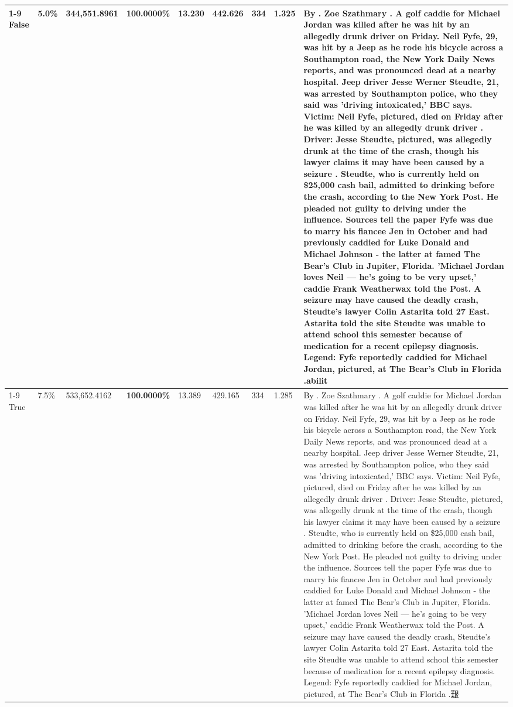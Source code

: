 \begin{table}[H]
\begin{tabular}{lllrlllll}
\cline{1-9}
False & 5.0\% & 344,551.8961 & \bfseries \color{red} 100.0000\% & 13.230 & 442.626 & 334 & 1.325 & By . Zoe Szathmary . A golf caddie for Michael Jordan was killed after he was hit by an allegedly drunk driver on Friday. Neil Fyfe, 29, was hit by a Jeep as he rode his bicycle across a Southampton road, the New York Daily News reports, and was pronounced dead at a nearby hospital. Jeep driver Jesse Werner Steudte, 21, was arrested by Southampton police, who they said was 'driving intoxicated,' BBC says. Victim: Neil Fyfe, pictured, died on Friday after he was killed by an allegedly drunk driver . Driver: Jesse Steudte, pictured, was allegedly drunk at the time of the crash, though his lawyer claims it may have been caused by a seizure . Steudte, who is currently held on \$25,000 cash bail, admitted to drinking before the crash, according to the New York Post. He pleaded not guilty to driving under the influence. Sources tell the paper Fyfe was due to marry his fiancee Jen in October and had previously caddied for Luke Donald and Michael Johnson - the latter at famed The Bear's Club in Jupiter, Florida. 'Michael Jordan loves Neil — he’s going to be very upset,' caddie Frank Weatherwax told the Post. A seizure may have caused the deadly crash, Steudte's lawyer Colin Astarita told 27 East. Astarita told the site Steudte was unable to attend school this semester because of medication for a recent epilepsy diagnosis. Legend: Fyfe reportedly caddied for Michael Jordan, pictured, at The Bear's Club in Florida .abilit \\
\cline{1-9}
True & 7.5\% & 533,652.4162 & \bfseries \color{red} 100.0000\% & 13.389 & 429.165 & 334 & 1.285 & By . Zoe Szathmary . A golf caddie for Michael Jordan was killed after he was hit by an allegedly drunk driver on Friday. Neil Fyfe, 29, was hit by a Jeep as he rode his bicycle across a Southampton road, the New York Daily News reports, and was pronounced dead at a nearby hospital. Jeep driver Jesse Werner Steudte, 21, was arrested by Southampton police, who they said was 'driving intoxicated,' BBC says. Victim: Neil Fyfe, pictured, died on Friday after he was killed by an allegedly drunk driver . Driver: Jesse Steudte, pictured, was allegedly drunk at the time of the crash, though his lawyer claims it may have been caused by a seizure . Steudte, who is currently held on \$25,000 cash bail, admitted to drinking before the crash, according to the New York Post. He pleaded not guilty to driving under the influence. Sources tell the paper Fyfe was due to marry his fiancee Jen in October and had previously caddied for Luke Donald and Michael Johnson - the latter at famed The Bear's Club in Jupiter, Florida. 'Michael Jordan loves Neil — he’s going to be very upset,' caddie Frank Weatherwax told the Post. A seizure may have caused the deadly crash, Steudte's lawyer Colin Astarita told 27 East. Astarita told the site Steudte was unable to attend school this semester because of medication for a recent epilepsy diagnosis. Legend: Fyfe reportedly caddied for Michael Jordan, pictured, at The Bear's Club in Florida .艱 \\

\end{tabular}
\end{table}
